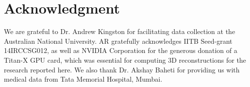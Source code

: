 \documentclass[journal]{IEEEtran}
\begin{document}
\section{Acknowledgment}
We are grateful to Dr. Andrew Kingston for facilitating data
collection at the Australian National University. AR gratefully
acknowledges IITB Seed-grant 14IRCCSG012, as well as NVIDIA
Corporation for the generous donation of a Titan-X GPU card, which was
essential for computing 3D reconstructions for the research reported
here. We also thank Dr. Akshay Baheti for providing us with medical
data from Tata Memorial Hospital, Mumbai.
{%
}
\end{document}
